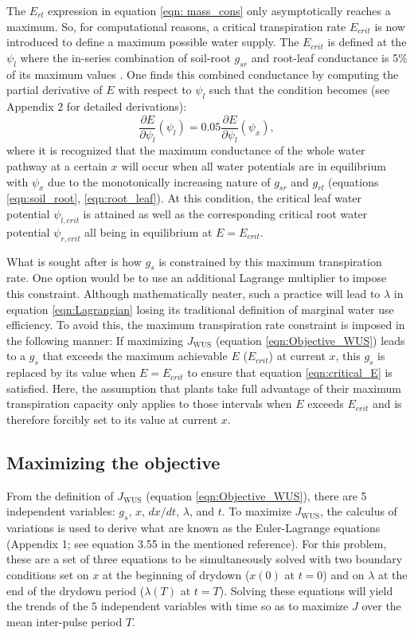 \documentclass[utf8]{frontiersSCNS} %
\begin{document}
The $E_{rl}$ expression in equation \ref{eqn: mass_cons} only asymptotically reaches a maximum. So, for computational reasons, a critical transpiration rate $E_{crit}$ is now introduced to define a maximum possible water supply. The $E_{crit}$ is defined at the $\psi_l$ where the in-series combination of soil-root $g_{sr}$ and root-leaf conductance is 5\% of its maximum values \citep{sperry_predicting_2017}. One finds this combined conductance by computing the partial derivative of $E$ with respect to $\psi_l$ such that the condition becomes (see Appendix 2 for detailed derivations):
\begin{equation}
    \label{eqn:critical_E}
    \frac{\partial E}{\partial \psi_l} (\psi_l) = 0.05 \frac{\partial E}{\partial \psi_l} (\psi_x),
\end{equation}
where it is recognized that the maximum conductance of the whole water pathway at a certain $x$ will occur when all water potentials are in equilibrium with $\psi_x$ due to the monotonically increasing nature of $g_{sr}$ and $g_{rl}$ (equations \ref{eqn:soil_root}, \ref{eqn:root_leaf}). At this condition, the critical leaf water potential $\psi_{l,crit}$ is attained as well as the corresponding critical root water potential $\psi_{r,crit}$ all being in equilibrium at $E = E_{crit}$.

What is sought after is how $g_s$ is constrained by this maximum transpiration rate. One option would be to use an additional Lagrange multiplier to impose this constraint. Although mathematically neater, such a practice will lead to $\lambda$ in equation \ref{eqn:Lagrangian} losing its traditional definition of marginal water use efficiency. To avoid this, the maximum transpiration rate constraint is imposed in the following manner: If maximizing $J_{\text{WUS}}$ (equation \ref{eqn:Objective_WUS}) leads to a $g_s$ that exceeds the maximum achievable $E$ ($E_{crit}$) at current $x$, this $g_s$ is replaced by its value when $E = E_{crit}$ to ensure that equation \ref{eqn:critical_E} is satisfied. Here, the assumption that plants take full advantage of their maximum transpiration capacity only applies to those intervals when $E$ exceeds $E_{crit}$ and is therefore forcibly set to its value at current $x$.

\subsection{Maximizing the objective}

From the definition of $J_{\text{WUS}}$ (equation \ref{eqn:Objective_WUS}), there are 5 independent variables: $g_s$, $x$, $dx / dt$, $\lambda$, and $t$. To maximize $J_{\text{WUS}}$, the calculus of variations \citep{witelski_variational_2015} is used to derive what are known as the Euler-Lagrange equations (Appendix 1; see equation 3.55 in the mentioned reference). For this problem, these are a set of three equations to be simultaneously solved with two boundary conditions set on $x$ at the beginning of drydown ($x(0)$ at $t=0$) and on $\lambda$ at the end of the drydown period ($\lambda(T)$ at $t=T$). Solving these equations will yield the trends of the 5 independent variables with time so as to maximize $J$ over the mean inter-pulse period $T$.
\end{document}
